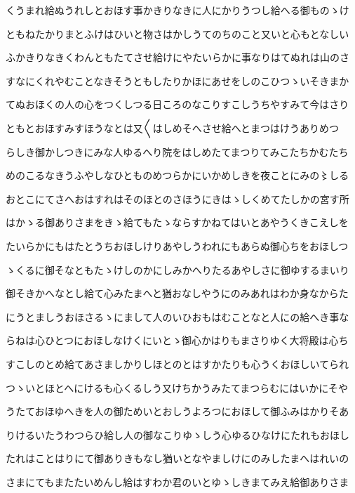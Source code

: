 \documentclass[a4paper,11pt,landscape]{ltjtarticle}
\begin{document}
\par\medskip
くうまれ給ぬうれしとおほす事かきりなきに人にかりうつし給へる御ものゝけ
\par\medskip
ともねたかりまとふけはひいと物さはかしうてのちのこと又いと心もとなしい
\par\medskip
ふかきりなきくわんともたてさせ給けにやたいらかに事なりはてぬれは山のさ
\par\medskip
すなにくれやむことなきそうともしたりかほにあせをしのこひつゝいそきまか
\par\medskip
てぬおほくの人の心をつくしつる日ころのなこりすこしうちやすみて今はさり
\par\medskip
ともとおほすみすほうなとは又〱はしめそへさせ給へとまつはけうありめつ
\par\medskip
らしき御かしつきにみな人ゆるへり院をはしめたてまつりてみこたちかむたち
\par\medskip
めのこるなきうふやしなひとものめつらかにいかめしきを夜ことにみの〻しる
\par\medskip
おとこにてさへおはすれはそのほとのさほうにきはゝしくめてたしかの宮す所
\par\medskip
はかゝる御ありさまをきゝ給てもたゝならすかねてはいとあやうくきこえしを
\par\medskip
たいらかにもはたとうちおほしけりあやしうわれにもあらぬ御心ちをおほしつ
\par\medskip
ゝくるに御そなともたゝけしのかにしみかへりたるあやしさに御ゆするまいり
\par\medskip
御そきかへなとし給て心みたまへと猶おなしやうにのみあれはわか身なからた
\par\medskip
にうとましうおほさるゝにまして人のいひおもはむことなと人にの給へき事な
\par\medskip
らねは心ひとつにおほしなけくにいとゝ御心かはりもまさりゆく大将殿は心ち
\par\medskip
すこしのとめ給てあさましかりしほとのとはすかたりも心うくおほしいてられ
\par\medskip
つゝいとほとへにけるも心くるしう又けちかうみたてまつらむにはいかにそや
\par\medskip
うたておほゆへきを人の御ためいとおしうよろつにおほして御ふみはかりそあ
\par\medskip
りけるいたうわつらひ給し人の御なこりゆゝしう心ゆるひなけにたれもおほし
\par\medskip
たれはことはりにて御ありきもなし猶いとなやましけにのみしたまへはれいの
\par\medskip
さまにてもまたたいめんし給はすわか君のいとゆゝしきまてみえ給御ありさま
\end{document}
